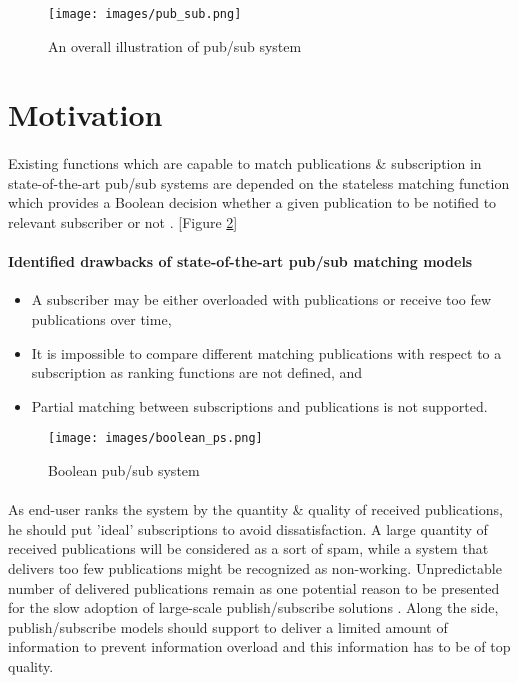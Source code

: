 \documentclass[a4paper,12pt,oneside]{book}
\theoremstyle{definition}
\theoremstyle{remark}
\begin{document}
\begin{figure}[h]
\begin{center}
\texttt{[image: images/pub\_sub.png]}
\caption{An overall illustration of pub/\-sub system}
\label{pub_sub}
\end{center}
\end{figure}

\section{Motivation}
\paragraph*{}
Existing functions which are capable to match publications \& subscription in state-of-the-art pub/sub systems are depended on the stateless matching function which provides a Boolean decision whether a given publication to be notified to relevant subscriber or not \cite{Pripuzi2008}. [Figure \ref{boolean_pub_sub}]

\paragraph*{Identified drawbacks of state-of-the-art pub/sub matching models \cite{Pripuzic2012}} 

\begin{itemize}
\item A subscriber may be either overloaded with publications or receive too few publications over time,
\item It is impossible to compare different matching publications with respect to a subscription as ranking
functions are not defined, and
\item Partial matching between subscriptions and publications is not supported.
\end{itemize}

\begin{figure}[h]
\begin{center}
\texttt{[image: images/boolean\_ps.png]}
\caption{Boolean pub/\-sub system}
\label{boolean_pub_sub}
\end{center}
\end{figure}

\paragraph*{}
As end-user ranks the system by the quantity \& quality of received publications, he should put 'ideal' subscriptions to avoid dissatisfaction. A large quantity of received publications will be considered as a sort of spam, while a system that delivers too few publications might be recognized as non-working. Unpredictable number of delivered publications remain as one potential reason to be presented for the slow adoption of large-scale publish/\-subscribe solutions \cite{Pripuzi2008}. Along the side, publish/subscribe models should support to deliver a limited amount of information to prevent information overload and this information has to be of top quality.
\end{document}
